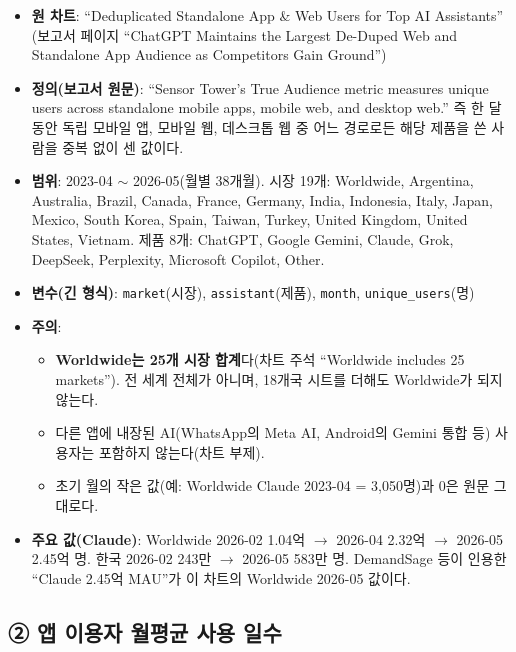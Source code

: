 \documentclass[11pt]{article}
\begin{document}
\begin{itemize}
  \item \textbf{원 차트}: ``Deduplicated Standalone App \& Web Users for Top AI Assistants'' (보고서 페이지 ``ChatGPT Maintains the Largest De-Duped Web and Standalone App Audience as Competitors Gain Ground'')
  \item \textbf{정의(보고서 원문)}: ``Sensor Tower's True Audience metric measures unique users across standalone mobile apps, mobile web, and desktop web.'' 즉 한 달 동안 독립 모바일 앱, 모바일 웹, 데스크톱 웹 중 어느 경로로든 해당 제품을 쓴 사람을 중복 없이 센 값이다.
  \item \textbf{범위}: 2023-04 $\sim$ 2026-05(월별 38개월). 시장 19개: Worldwide, Argentina, Australia, Brazil, Canada, France, Germany, India, Indonesia, Italy, Japan, Mexico, South Korea, Spain, Taiwan, Turkey, United Kingdom, United States, Vietnam. 제품 8개: ChatGPT, Google Gemini, Claude, Grok, DeepSeek, Perplexity, Microsoft Copilot, Other.
  \item \textbf{변수(긴 형식)}: \texttt{market}(시장), \texttt{assistant}(제품), \texttt{month}, \texttt{unique\_users}(명)
  \item \textbf{주의}:
  \begin{itemize}
    \item \textbf{Worldwide는 25개 시장 합계}다(차트 주석 ``Worldwide includes 25 markets''). 전 세계 전체가 아니며, 18개국 시트를 더해도 Worldwide가 되지 않는다.
    \item 다른 앱에 내장된 AI(WhatsApp의 Meta AI, Android의 Gemini 통합 등) 사용자는 포함하지 않는다(차트 부제).
    \item 초기 월의 작은 값(예: Worldwide Claude 2023-04 = 3,050명)과 0은 원문 그대로다.
  \end{itemize}
  \item \textbf{주요 값(Claude)}: Worldwide 2026-02 1.04억 $\to$ 2026-04 2.32억 $\to$ 2026-05 2.45억 명. 한국 2026-02 243만 $\to$ 2026-05 583만 명. DemandSage 등이 인용한 ``Claude 2.45억 MAU''가 이 차트의 Worldwide 2026-05 값이다.
\end{itemize}

\subsection{② 앱 이용자 월평균 사용 일수}
\end{document}
